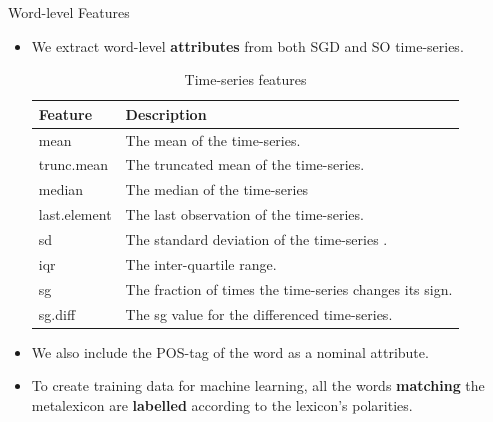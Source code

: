 \documentclass[handout]{beamer}
\begin{document}
\begin{frame}{Word-level Features}
\begin{scriptsize}
\begin{itemize}
\item We extract word-level \textbf{attributes} from both SGD and SO time-series.
\begin{table}[htbp]
\footnotesize
\begin{center}
\begin{tabular}{l|l}
\hline
Feature & Description \\ \hline
mean &  The mean of the time-series. \\ 
trunc.mean &  The truncated mean of the time-series. \\ 
median &  The median of the time-series \\ 
last.element &  The last observation of the time-series.\\ 
sd &  The standard deviation of the time-series . \\ 
iqr &  The inter-quartile range. \\ 
sg &  The fraction of times the time-series changes its sign. \\ 
sg.diff &  The sg value for the  differenced time-series. \\ \hline
\end{tabular}
\end{center}
\caption{Time-series features}
\label{tab:feat}
\end{table}

\item We also include the POS-tag of the word as a nominal attribute.

\item To create training data for machine learning, all the words \textbf{matching} the metalexicon are \textbf{labelled} according to the lexicon's polarities.

\end{itemize}
\end{scriptsize}

\end{frame}
\end{document}
